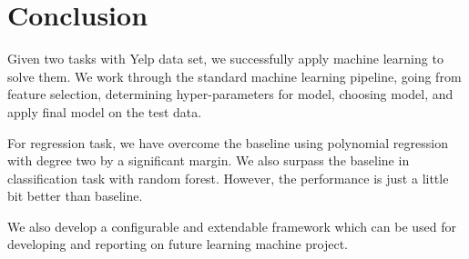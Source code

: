 \section{Conclusion}
\label{sec:five}

Given two tasks with Yelp data set, we successfully apply machine learning to solve them. We work through the standard machine learning pipeline, going from feature selection, determining hyper-parameters for model, choosing model, and apply final model on the test data.

For regression task, we have overcome the baseline using polynomial regression with degree two by a significant margin. We also surpass the baseline in classification task with random forest. However, the performance is just a little bit better than baseline.

We also develop a configurable and extendable framework which can be used for developing and reporting on future learning machine project.

